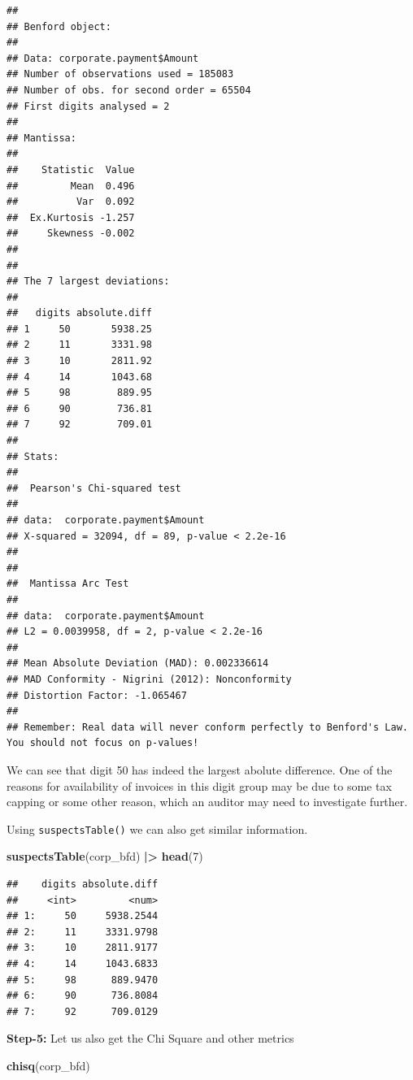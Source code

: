 \documentclass[
]{book}
\newenvironment{Shaded}{\begin{snugshade}}{\end{snugshade}}
\newcommand{\DecValTok}[1]{\textcolor[rgb]{0.00,0.00,0.81}{#1}}
\newcommand{\FunctionTok}[1]{\textcolor[rgb]{0.13,0.29,0.53}{\textbf{#1}}}
\newcommand{\NormalTok}[1]{#1}
\newcommand{\SpecialCharTok}[1]{\textcolor[rgb]{0.81,0.36,0.00}{\textbf{#1}}}
\begin{document}
\begin{verbatim}
## 
## Benford object:
##  
## Data: corporate.payment$Amount 
## Number of observations used = 185083 
## Number of obs. for second order = 65504 
## First digits analysed = 2
## 
## Mantissa: 
## 
##    Statistic  Value
##         Mean  0.496
##          Var  0.092
##  Ex.Kurtosis -1.257
##     Skewness -0.002
## 
## 
## The 7 largest deviations: 
## 
##   digits absolute.diff
## 1     50       5938.25
## 2     11       3331.98
## 3     10       2811.92
## 4     14       1043.68
## 5     98        889.95
## 6     90        736.81
## 7     92        709.01
## 
## Stats:
## 
##  Pearson's Chi-squared test
## 
## data:  corporate.payment$Amount
## X-squared = 32094, df = 89, p-value < 2.2e-16
## 
## 
##  Mantissa Arc Test
## 
## data:  corporate.payment$Amount
## L2 = 0.0039958, df = 2, p-value < 2.2e-16
## 
## Mean Absolute Deviation (MAD): 0.002336614
## MAD Conformity - Nigrini (2012): Nonconformity
## Distortion Factor: -1.065467
## 
## Remember: Real data will never conform perfectly to Benford's Law. You should not focus on p-values!
\end{verbatim}

We can see that digit 50 has indeed the largest abolute difference. One of the reasons for availability of invoices in this digit group may be due to some tax capping or some other reason, which an auditor may need to investigate further.

Using \texttt{suspectsTable()} we can also get similar information.

\begin{Shaded}
\begin{Highlighting}[]
\FunctionTok{suspectsTable}\NormalTok{(corp\_bfd) }\SpecialCharTok{|\textgreater{}} 
  \FunctionTok{head}\NormalTok{(}\DecValTok{7}\NormalTok{)}
\end{Highlighting}
\end{Shaded}

\begin{verbatim}
##    digits absolute.diff
##     <int>         <num>
## 1:     50     5938.2544
## 2:     11     3331.9798
## 3:     10     2811.9177
## 4:     14     1043.6833
## 5:     98      889.9470
## 6:     90      736.8084
## 7:     92      709.0129
\end{verbatim}

\textbf{Step-5:} Let us also get the Chi Square and other metrics

\begin{Shaded}
\begin{Highlighting}[]
\FunctionTok{chisq}\NormalTok{(corp\_bfd)}
\end{Highlighting}
\end{Shaded}
\end{document}
